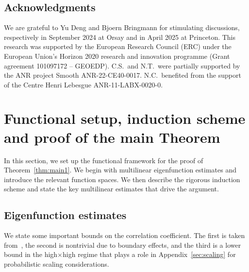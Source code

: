 \documentclass[11pt,reqno,english]{amsart}
\numberwithin{equation}{section}
\theoremstyle{plain}
\theoremstyle{definition}
\theoremstyle{remark}
\begin{document}
\subsection*{Acknowledgments}
We are grateful to Yu Deng and Bjoern Bringmann for stimulating discussions, respectively in September 2024 at Orsay and in April 2025 at Princeton.
This research was supported by the European Research Council (ERC) under the European Union's Horizon 2020 research and innovation programme (Grant agreement 101097172 -- GEOEDP). C.S.\ and N.T.\ were partially supported by the ANR project Smooth ANR-22-CE40-0017.
N.C.\ benefited from the support of the Centre Henri Lebesgue ANR-11-LABX-0020-0.


	

	\section{Functional setup, induction scheme and proof of the main Theorem}\label{sec:functional}

In this section, we set up the functional framework for the proof of Theorem~\ref{thm:main1}. We begin with multilinear eigenfunction estimates and introduce the relevant function spaces. We then describe the rigorous induction scheme and state the key multilinear estimates that drive the argument.

\subsection{Eigenfunction estimates}
We state some important bounds on the correlation coefficient. The first is taken from~\cite{BB14}, the second is nontrivial due to boundary effects, and the third is a lower bound in the high$\times$high regime that plays a role in Appendix~\ref{sec:scaling} for probabilistic scaling considerations.
\end{document}
